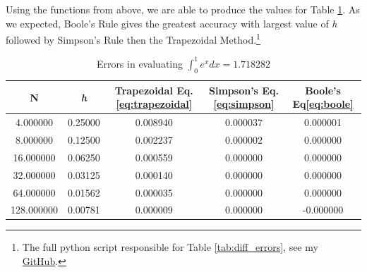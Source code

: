 \documentclass[10pt]{article}
\begin{document}
Using the functions from above, we are able to produce the values for Table \ref{tab:quad_errors}. As we expected, Boole's Rule gives the greatest accuracy with largest value of \textit{h} followed by Simpson's Rule then the Trapezoidal Method.\footnote{The full python script responsible for Table \ref{tab:diff_errors}, see my \href{https://github.com/jmelahman/computational-physics-solutions/blob/master/exercises_python/Chapter\%201/exercise1_2.py}{GitHub}.} 
\begin{table}[!ht]
	\begin{center}
	\caption{Errors in evaluating $\int^1_0 e^x dx = 1.718282$ }
		\label{tab:quad_errors}
		\begin{tabular}{|ccccc|}
		\hline
		N & \textit{h} & Trapezoidal Eq.\ref{eq:trapezoidal} & Simpson's Eq.\ref{eq:simpson} & Boole's Eq\ref{eq:boole} \\
		\hline
		4.000000&0.25000&0.008940&0.000037&0.000001\\ 
		8.000000&0.12500&0.002237&0.000002&0.000000\\ 
		16.000000&0.06250&0.000559&0.000000&0.000000\\ 
		32.000000&0.03125&0.000140&0.000000&0.000000\\ 
		64.000000&0.01562&0.000035&0.000000&0.000000\\ 
		128.000000&0.00781&0.000009&0.000000&-0.000000\\ 
		\hline
		\end{tabular}
	\end{center}
\end{table}
\end{document}
